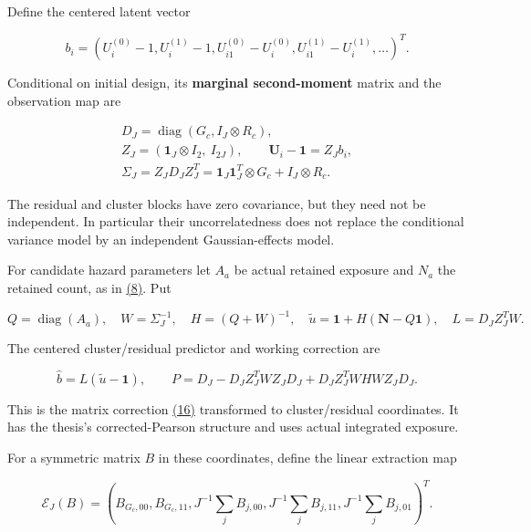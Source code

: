 \documentclass[11pt]{article}
\begin{document}
Define the centered latent vector

\begin{equation*}
b_i=(U_i^{(0)}-1,U_i^{(1)}-1,
 U_{i1}^{(0)}-U_i^{(0)},U_{i1}^{(1)}-U_i^{(1)},\ldots)^T.
\tag{18}\label{eq:18}
\end{equation*}

Conditional on initial design, its \textbf{marginal second-moment} matrix and the observation map are

\begin{equation*}
\begin{gathered}
D_J=\operatorname{diag}({G_c},I_J\otimes {R_c}), \\
Z_J=(\mathbf1_J\otimes I_2,\ I_{2J}),\qquad \mathbf U_i-\mathbf1=Z_Jb_i, \\
\Sigma_J=Z_JD_JZ_J^T=\mathbf1_J\mathbf1_J^T\otimes {G_c}+I_J\otimes {R_c}.
\end{gathered}
\tag{19}\label{eq:19}
\end{equation*}

The residual and cluster blocks have zero covariance, but they need not be independent. In particular their uncorrelatedness does not replace the conditional variance model by an independent Gaussian-effects model.

For candidate hazard parameters let \(A_a\) be actual retained exposure and \(N_a\) the retained count, as in \hyperref[eq:8]{(8)}. Put

\begin{equation*}
Q=\operatorname{diag}(A_a),\quad W=\Sigma_J^{-1},\quad
H=(Q+W)^{-1},\quad
\widetilde u=\mathbf1+H(\mathbf N-Q\mathbf1),\quad L=D_JZ_J^TW.
\tag{20}\label{eq:20}
\end{equation*}

The centered cluster/residual predictor and working correction are

\begin{equation*}
\widehat b=L(\widetilde u-\mathbf1),\qquad
P=D_J-D_JZ_J^TWZ_JD_J+D_JZ_J^TWHWZ_JD_J.
\tag{21}\label{eq:21}
\end{equation*}

This is the matrix correction \hyperref[eq:16]{(16)} transformed to cluster/residual coordinates. It has the thesis's corrected-Pearson structure and uses actual integrated exposure.

For a symmetric matrix \(B\) in these coordinates, define the linear extraction map

\begin{equation*}
\mathcal E_J(B)=\left(B_{{G_c},00},B_{{G_c},11},
 J^{-1}\sum_jB_{j,00},J^{-1}\sum_jB_{j,11},
 J^{-1}\sum_jB_{j,01}\right)^T.
\tag{22}\label{eq:22}
\end{equation*}
\end{document}
